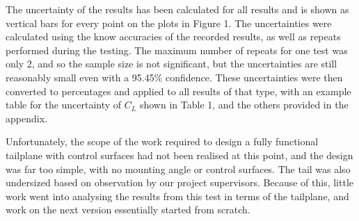 \documentclass[../../main.tex]{subfiles}
\begin{document}
The uncertainty of the results has been calculated for all results and is shown as vertical bars for every point on the plots in Figure 1.
The uncertainties were calculated using the know accuracies of the recorded results, as well as repeats performed during the testing.
The maximum number of repeats for one test was only 2, and so the sample size is not significant, but the uncertainties are still reasonably small even with a 95.45\% confidence.
These uncertainties were then converted to percentages and applied to all results of that type, with an example table for the uncertainty of $C_L$ shown in Table 1, and the others provided in the appendix. 



Unfortunately, the scope of the work required to design a fully functional tailplane with control surfaces had not been realised at this point, and the design was far too simple, with no mounting angle or control surfaces.
The tail was also undersized based on observation by our project supervisors.
Because of this, little work went into analysing the results from this test in terms of the tailplane, and work on the next version essentially started from scratch. 
\end{document}
